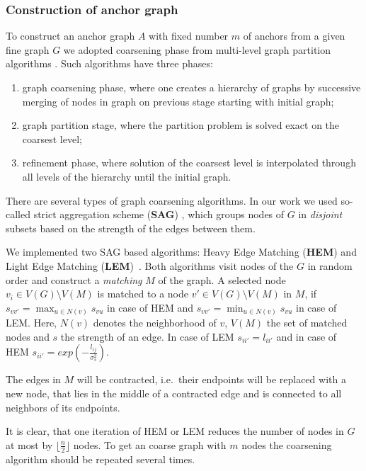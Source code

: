 \subsubsection{Construction of anchor graph}	                         
To construct an anchor graph $A$ with fixed number $m$ of anchors from a given fine graph $G$ we adopted coarsening phase from multi-level graph partition algorithms \cite{Chevalier09_GP, Safro2012_GC, Karypis95_GP, Hendrickson1995}.
Such algorithms have three phases: 
\begin{enumerate}
	\item graph coarsening phase, where one creates a hierarchy of graphs by successive merging of nodes in graph on previous stage starting with initial graph;
	\item graph partition stage, where the partition problem is solved exact on the coarsest level;
	\item refinement phase, where solution of the coarsest level is interpolated through all levels of the hierarchy until the initial graph.
\end{enumerate}
There are several types of graph coarsening algorithms. In our work we used so-called strict aggregation scheme (\textbf{SAG}) \cite{Chevalier09_GP}, which groups nodes of $G$ in \emph{disjoint} subsets based on the strength of the edges between them. 

We implemented two SAG based algorithms: Heavy Edge Matching (\textbf{HEM}) and Light Edge Matching (\textbf{LEM})~\cite{Chevalier09_GP}. Both algorithms visit nodes of the $G$ in random order and construct a \emph{matching} $M$ of the graph. A selected node $v_i\in V(G)\setminus V(M)$ is matched to a node $v\prime\in V(G)\setminus V(M)$ in $M$, if $s_{vv\prime} = \max_{u\in N(v)} s_{vu}$ in case of HEM and
$s_{vv\prime} = \min_{u\in N(v)} s_{vu}$ in case of LEM. Here, $N(v)$ denotes the neighborhood of $v$, $V(M)$ the set of matched nodes and $s$ the strength of an edge. In case of LEM $s_{ii\prime} = l_{ii\prime}$ and in case of HEM $s_{ii\prime} = exp(-\frac{l_{ij}}{\sigma^2_{s}})$.

The edges in $M$ will be contracted, i.e.\ their endpoints will be replaced with a new node, that lies in the middle of a contracted edge and is connected to all neighbors of its endpoints.

It is clear, that one iteration of HEM or LEM reduces the number of nodes in $G$ at most by $\lfloor\frac{n}{2} \rfloor$ nodes. To get an coarse graph with $m$ nodes the coarsening algorithm should be repeated several times.

